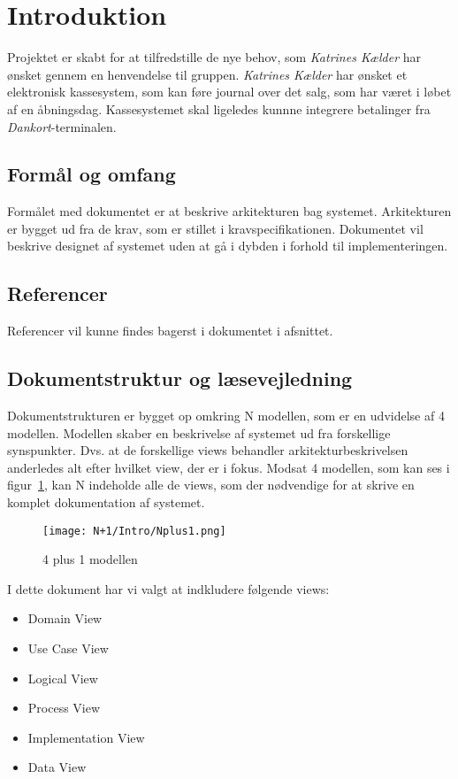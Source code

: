\section{Introduktion}
Projektet er skabt for at tilfredstille de nye behov, som \textit{Katrines Kælder} har ønsket gennem en henvendelse til gruppen. \textit{Katrines Kælder} har ønsket et elektronisk kassesystem, som kan føre journal over det salg, som har været i løbet af en åbningsdag. Kassesystemet skal ligeledes kunnne integrere betalinger fra \textit{Dankort}-terminalen.

\subsection{Formål og omfang}
Formålet med dokumentet er at beskrive arkitekturen bag systemet. Arkitekturen er bygget ud fra de krav, som er stillet i kravspecifikationen. Dokumentet vil beskrive designet af systemet uden at gå i dybden i forhold til implementeringen.

\subsection{Referencer}
Referencer vil kunne findes bagerst i dokumentet i afsnittet.

\subsection{Dokumentstruktur og læsevejledning}
Dokumentstrukturen er bygget op omkring N modellen, som er en udvidelse af 4 modellen. Modellen skaber en beskrivelse af systemet ud fra forskellige synspunkter. Dvs. at de forskellige views behandler arkitekturbeskrivelsen anderledes alt efter hvilket view, der er i fokus. Modsat 4 modellen, som kan ses i figur~\ref{fig:4plus1}, kan N indeholde alle de views, som der nødvendige for at skrive en komplet dokumentation af systemet.

\begin{figure}[H]
	\centering
	\texttt{[image: N+1/Intro/Nplus1.png]}
	\caption{4 plus 1 modellen}
	\label{fig:4plus1}
\end{figure}

I dette dokument har vi valgt at indkludere følgende views:

\begin{itemize}
	\item Domain View
	\item Use Case View
	\item Logical View
	\item Process View
	\item Implementation View
	\item Data View
\end{itemize}

